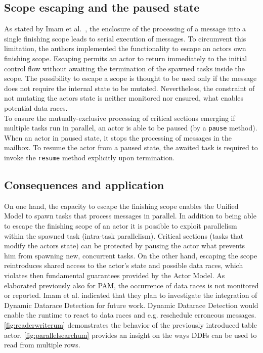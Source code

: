 \documentclass[11pt, journal]{IEEEtran}
\newcommand{\ct}{\lstinline[backgroundcolor=\color{white},basicstyle=\footnotesize\ttfamily]}
\begin{document}
\subsection{Scope escaping and the paused state}\label{subsec:excapingandpausing}
As stated by Imam et al.~\cite{Imam:2012:ITP:2384616.2384671}, the enclosure of the processing of a message into a single finishing scope leads to serial execution of messages. To circumvent this limitation, the authors implemented the functionality to escape an actors own finishing scope. Escaping permits an actor to return immediately to the initial control flow without awaiting the termination of the spawned tasks inside the scope. The possibility to escape a scope is thought to be used only if the message does not require the internal state to be mutated. Nevertheless, the constraint of not mutating the actors state is neither monitored nor ensured, what enables potential data races.\\ 
To ensure the mutually-exclusive processing of critical sections emerging if multiple tasks run in parallel, an actor is able to be paused (by a \ct{pause} method). When an actor in paused state, it stops the processing of messages in the mailbox. To resume the actor from a paused state, the awaited task is required to invoke the \ct{resume} method explicitly upon termination.

\subsection{Consequences and application}\label{sec:umconsequencesandapplication}
On one hand, the capacity to escape the finishing scope enables the Unified Model to spawn tasks that process messages in parallel. In addition to being able to escape the finishing scope of an actor it is possible to exploit parallelism within the spawned task (intra-task parallelism). Critical sections (tasks that modify the actors state) can be protected by pausing the actor what prevents him from spawning new, concurrent tasks. On the other hand, escaping the scope reintroduces shared access to the actor's state and possible data races, which violates then fundamental guarantees provided by the Actor Model. As elaborated previously also for PAM, the occurrence of data races is not monitored or reported. Imam et al. indicated that they plan to investigate the integration of Dynamic Datarace Detection for future work. Dynamic Datarace Detection would enable the runtime to react to data races and e.g. reschedule erroneous messages. \autoref{fig:readerwriterum} demonstrates the behavior of the previously introduced table actor. \autoref{fig:parallelsearchum} provides an insight on the ways DDFs can be used to read from multiple rows.
\end{document}
